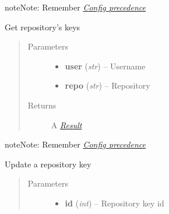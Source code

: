\documentclass[letterpaper,10pt,english]{sphinxmanual}
\begin{document}
\begin{fulllineitems}
\begin{fulllineitems}
\begin{quote}
\begin{description}
\begin{itemize}
\end{itemize}

\end{description}\end{quote}

\begin{notice}{note}{Note:}
Remember {\hyperref[repos:config-precedence]{\emph{Config precedence}}}
\end{notice}

\end{fulllineitems}


\begin{fulllineitems}
\label{repos:pygithub3.services.repos.Keys.list}
Get repository's keys
\begin{quote}\begin{description}
\item[{Parameters}] \leavevmode\begin{itemize}
\item {} 
\textbf{user} (\emph{str}) -- Username

\item {} 
\textbf{repo} (\emph{str}) -- Repository

\end{itemize}

\item[{Returns}] \leavevmode
A {\hyperref[result::doc]{\emph{Result}}}

\end{description}\end{quote}

\begin{notice}{note}{Note:}
Remember {\hyperref[repos:config-precedence]{\emph{Config precedence}}}
\end{notice}

\end{fulllineitems}


\begin{fulllineitems}
\label{repos:pygithub3.services.repos.Keys.update}
Update a repository key
\begin{quote}\begin{description}
\item[{Parameters}] \leavevmode\begin{itemize}
\item {} 
\textbf{id} (\emph{int}) -- Repository key id


\end{itemize}
\end{description}
\end{quote}
\end{fulllineitems}
\end{fulllineitems}
\end{document}
